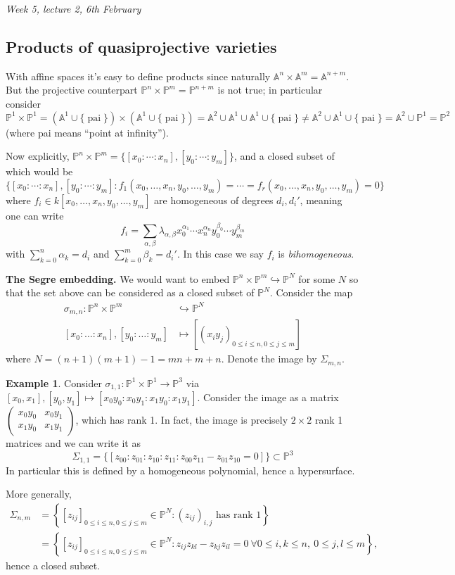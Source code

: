 \documentclass{article}
\newcommand{\A}{\mathbb{A}}
\newcommand{\p}{\mathbb{P}}
\theoremstyle{definition}
\newtheorem{example}[defn]{Example}
\begin{document}
\begin{flushright}
\textit{Week 5, lecture 2, 6th February}
\end{flushright}

\subsection{Products of quasiprojective varieties}
With affine spaces it's easy to define products since naturally $\A^n\times\A^m=\A^{n+m}$. But the projective counterpart $\p^n\times\p^m=\p^{n+m}$ is not true; in particular consider
\[
\p^1\times\p^1=(\A^1\cup\{\operatorname{pai}\})\times (\A^1\cup\{\operatorname{pai}\})=\A^2\cup\A^1\cup\A^1\cup\{\operatorname{pai}\}\neq\A^2\cup\A^1\cup\{\operatorname{pai}\}=\A^2\cup\p^1=\p^2
\]
(where pai means ``point at infinity'').

Now explicitly, $\p^n\times\p^m=\{[x_0:\cdots:x_n],[y_0:\cdots:y_m]\}$, and a closed subset of which would be 
\[
\{[x_0:\cdots:x_n],[y_0:\cdots:y_m]:f_1(x_0,\ldots,x_n,y_0,\ldots,y_m)=\cdots=f_r(x_0,\ldots,x_n,y_0,\ldots,y_m)=0\}
\]
where $f_i\in k[x_0,\ldots,x_n,y_0,\ldots,y_m]$ are homogeneous of degrees $d_i,d_i'$, meaning one can write
\[
f_i=\sum_{\alpha,\beta}\lambda_{\alpha,\beta}x_0^{\alpha_1}\cdots x_n^{\alpha_n}y_0^{\beta_0}\cdots y_m^{\beta_m}
\]
with $\sum_{k=0}^n \alpha_k=d_i$ and $\sum_{k=0}^m \beta_k=d_i'$. In this case we say $f_i$ is \textit{bihomogeneous}.

\textbf{The Segre embedding.} We would want to embed $\p^n\times\p^m\hookrightarrow\p^N$ for some $N$ so that the set above can be considered as a closed subset of $\p^N$. Consider the map
\[
\begin{aligned}
\sigma_{m,n}:\p^n\times\p^m&\hookrightarrow\p^N \\
[x_0:\ldots:x_n],[y_0:\ldots:y_m]&\mapsto \left[(x_iy_j)_{0\leq i\leq n,0\leq j\leq m}\right]
\end{aligned}
\]
where $N=(n+1)(m+1)-1=mn+m+n$. Denote the image by $\Sigma_{m,n}$.

\begin{example}
Consider $\sigma_{1,1}:\p^1\times\p^1\rightarrow\p^3$ via $[x_0,x_1],[y_0,y_1]\mapsto [x_0y_0:x_0y_1:x_1y_0:x_1y_1]$. Consider the image as a matrix $\begin{pmatrix}
x_0y_0 & x_0y_1 \\ x_1y_0 & x_1y_1
\end{pmatrix}$, which has rank 1. In fact, the image is precisely $2\times 2$ rank 1 matrices and we can write it as
\[
\Sigma_{1,1}=\{[z_{00}:z_{01}:z_{10}:z_{11}:z_{00}z_{11}-z_{01}z_{10}=0]\}\subset\p^3
\]
In particular this is defined by a homogeneous polynomial, hence a hypersurface.
\end{example}
More generally,
\[
\begin{aligned}
\Sigma_{n,m}&=\left\{\left[{z_{ij}}\right]_{0\leq i\leq n,0\leq j\leq m}\in\p^N:\left(z_{ij}\right)_{i,j}\text{ has rank 1}\right\}\\
&=\left\{\left[{z_{ij}}\right]_{0\leq i\leq n,0\leq j\leq m}\in\p^N:z_{ij}z_{kl}-z_{kj}z_{il}=0 \ \forall 0\leq i,k\leq n,\ 0\leq j,l\leq m\right\},
\end{aligned}
\]
hence a closed subset.
\end{document}
